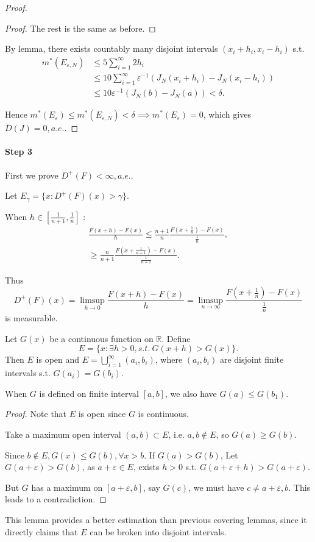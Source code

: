 \begin{proof}[Proof]
\begin{proof}[Proof]
		The rest is the same as before.
	\end{proof}

	By lemma, there exists countably many disjoint intervals
	$(x_i+h_i, x_i-h_i)$ s.t.
	\begin{align*}
	m^*(E_{\varepsilon,N})&\le 5 \sum_{i=1}^{\infty}2h_i\\
	&\le 10 \sum_{i=1}^{\infty} \varepsilon^{-1}(J_N(x_i+h_i)-J_N(x_i-h_i))\\
	&\le 10 \varepsilon^{-1} (J_N(b)-J_N(a)) < \delta.
	\end{align*}

	Hence $m^*(E_\varepsilon)\le m^*(E_{\varepsilon, N})
	<\delta \implies m^*(E_\varepsilon) = 0$,
	which gives $\overline{D}(J) = 0, a.e.$.
\end{proof}

\paragraph{Step 3}
First we prove $D^+(F)<\infty, a.e.$.

Let $E_\gamma = \{x: D^+(F)(x)>\gamma\}$.

When $h\in [\frac{1}{n+1}, \frac{1}{n}]$ :
\begin{align*}
	\frac{F(x+h) - F(x)}{h}\le \frac{n+1}{n} \frac{F(x+\frac{1}{n})-F(x)}{\frac{1}{n}},\\
	\ge \frac{n}{n+1}\frac{F(x+\frac{1}{n+1})-F(x)}{\frac{1}{n+1}}.
\end{align*}

Thus
\[
D^+(F)(x) = \limsup_{h\to 0}\frac{F(x+h)-F(x)}{h}
=\limsup_{n\to \infty} \frac{F(x+\frac{1}{n})-F(x)}{\frac{1}{n}}
\]
is measurable.

\begin{lemma}
	\label{lem:sunrise}
	Let $G(x)$ be a continuous function on $\mathbb{R}$. Define
	\[
	E = \{x: \exists h>0, s.t.\ G(x+h)>G(x)\}.
	\]
	Then $E$ is open and $E = \bigcup_{i=1}^\infty (a_i, b_i)$,
	where $(a_i,b_i)$ are disjoint finite intervals s.t. $G(a_i) = G(b_i)$.

	When $G$ is defined on finite interval $[a,b]$, we also have $G(a)\le G(b_1)$.
\end{lemma}
\begin{proof}[Proof]
    Note that $E$ is open since $G$ is continuous.

	Take a maximum open interval $(a,b) \subset E$,
	i.e. $a,b\notin E$, so $G(a)\ge G(b)$.

	Since $b\notin E, G(x)\le G(b), \forall x>b$.
	If $G(a)>G(b)$,
	Let  $G(a+\varepsilon) > G(b)$, as $a+\varepsilon\in E$,
	exists $h>0$ s.t. $G(a+\varepsilon+h)>G(a+\varepsilon)$.

	But $G$ has a maximum on $[a+\varepsilon, b]$, say $G(c)$,
	we must have $c\ne a+\varepsilon, b$.
	This leads to a contradiction.
\end{proof}
\begin{remark}
    This lemma provides a better estimation than
	previous covering lemmas, since it directly
	claims that $E$ can be broken into disjoint
	intervals.
\end{remark}

